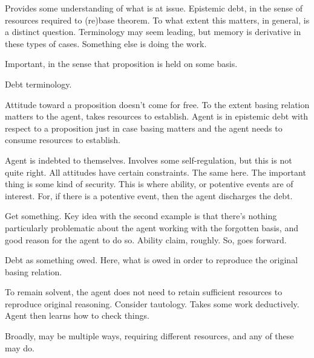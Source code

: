 \begin{note}[Sketch]
  Provides some understanding of what is at issue.
  Epistemic debt, in the sense of resources required to (re)base theorem.
  To what extent this matters, in general, is a distinct question.
  Terminology may seem leading, but memory is derivative in these types of cases.
  Something else is doing the work.

  Important, in the sense that proposition is held on some basis.
  

\end{note}

\begin{note}[Terminology]
  Debt terminology.

  Attitude toward a proposition doesn't come for free.
  To the extent basing relation matters to the agent, takes resources to establish.
  Agent is in epistemic debt with respect to a proposition just in case basing matters and the agent needs to consume resources to establish.

  Agent is indebted to themselves.
  Involves some self-regulation, but this is not quite right.
  All attitudes have certain constraints.
  The same here.
  The important thing is some kind of security.
  This is where ability, or potentive events are of interest.
  For, if there is a potentive event, then the agent discharges the debt.



  Get something.
  Key idea with the second example is that there's nothing particularly problematic about the agent working with the forgotten basis, and good reason for the agent to do so.
  Ability claim, roughly.
  So, goes forward.

\end{note}

Debt as something owed.
Here, what is owed in order to reproduce the original basing relation.

\begin{note}
  To remain solvent, the agent does not need to retain sufficient resources to reproduce original reasoning.
  Consider tautology.
  Takes some work deductively.
  Agent then learns how to check things.

  Broadly, may be multiple ways, requiring different resources, and any of these may do.
\end{note}


